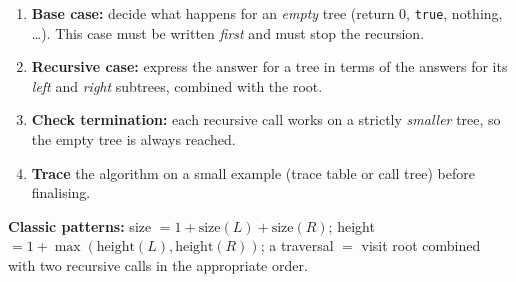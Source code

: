 \documentclass[11pt]{article}
\begin{document}
\begin{methode}
\begin{enumerate}
\item \textbf{Base case:} decide what happens for an \emph{empty} tree (return $0$, \texttt{true}, nothing, \ldots). This case must be written \emph{first} and must stop the recursion.
\item \textbf{Recursive case:} express the answer for a tree in terms of the answers for its \emph{left} and \emph{right} subtrees, combined with the root.
\item \textbf{Check termination:} each recursive call works on a strictly \emph{smaller} tree, so the empty tree is always reached.
\item \textbf{Trace} the algorithm on a small example (trace table or call tree) before finalising.
\end{enumerate}
\textbf{Classic patterns:} size $= 1 + \text{size}(L) + \text{size}(R)$; height $= 1 + \max(\text{height}(L), \text{height}(R))$; a traversal $=$ visit root combined with two recursive calls in the appropriate order.
\end{methode}
\end{document}
